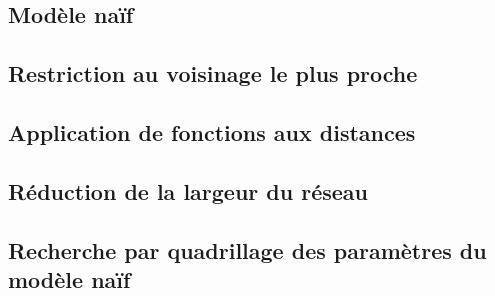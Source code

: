 \subsection{Modèle naïf}

\subsection{Restriction au voisinage le plus proche}

\subsection{Application de fonctions aux distances}

\subsection{Réduction de la largeur du réseau}

\subsection{Recherche par quadrillage des paramètres du modèle naïf}

